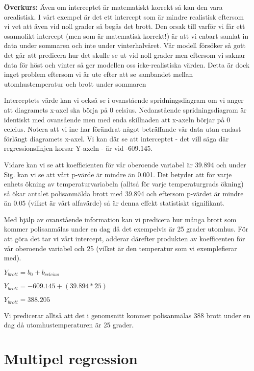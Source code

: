 \documentclass[
]{book}
\begin{document}
\textbf{Överkurs:}
Även om interceptet är matematiskt korrekt så kan den vara orealistisk. I vårt exempel är det ett intercept som är mindre realistisk eftersom vi vet att även vid noll grader så begås det brott. Den orsak till varför vi får ett osannolikt intercept (men som är matematisk korrekt!) är att vi enbart samlat in data under sommaren och inte under vinterhalvåret. Vår modell försöker så gott det går att predicera hur det skulle se ut vid noll grader men eftersom vi saknar data för höst och vinter så ger modellen oss icke-realistiska värden. Detta är dock inget problem eftersom vi är ute efter att se sambandet mellan utomhustemperatur och brott under sommaren

Interceptets värde kan vi också se i ovanstående spridningsdiagram om vi anger att diagramets x-axel ska börja på 0 celsius. Nedanstående spridningsdiagram är identiskt med ovansående men med enda skillnaden att x-axeln börjar på 0 celcius. Notera att vi ine har förändrat något beträffande vår data utan endast förlängt diagramets x-axel. Vi kan där se att interceptet - det vill säga där regressionslinjen korsar Y-axeln - är vid -609.145.

Vidare kan vi se att koefficienten för vår oberoende variabel är 39.894 och under Sig. kan vi se att vårt p-värde är mindre än 0.001. Det betyder att för varje enhets ökning av temperaturvariabeln (alltså för varje temperaturgrads ökning) så ökar antalet polisanmälda brott med 39.894 och eftersom p-värdet är mindre än 0.05 (vilket är vårt alfavärde) så är denna effekt statistiskt signifikant.

Med hjälp av ovanstående information kan vi predicera hur många brott som kommer polisanmälas under en dag då det exempelvis är 25 grader utomhus. För att göra det tar vi vårt intercept, adderar därefter produkten av koefficenten för vår oberoende variabel och 25 (vilket är den temperatur som vi exemplefierar med).

\(Y_{brott} = b_0 + b_{celcius}\)

\(Y_{brott} = -609.145 + (39.894*25)\)

\(Y_{brott} = 388.205\)

Vi predicerar alltså att det i genomsnitt kommer polisanmälas 388 brott under en dag då utomhustemperaturen är 25 grader.

\hypertarget{multipel-regression}{%
\chapter{Multipel regression}\label{multipel-regression}}
\end{document}
